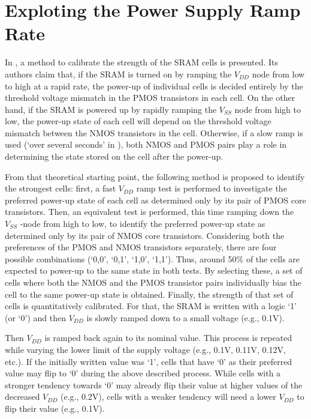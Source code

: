 \section{Exploting the Power Supply Ramp Rate}
\label{sec:bitselection:supply_ramp}
In \cite{Wang2018}, a method to calibrate the strength of the SRAM cells is presented. Its authors claim that, if the SRAM is turned on by ramping the $V_{DD}$ node from low to high at a rapid rate, the power-up of individual cells is decided entirely by the threshold voltage mismatch in the PMOS transistors in each cell. On the other hand, if the SRAM is powered up by rapidly ramping the $V_{SS}$ node from high to low, the power-up state of each cell will depend on the threshold voltage mismatch between the NMOS transistors in the cell. Otherwise, if a slow ramp is used (‘over several seconds’ in \cite{Wang2018}), both NMOS and PMOS pairs play a role in determining the state stored on the cell after the power-up.


From that theoretical starting point, the following method is proposed to identify the strongest cells: first, a fast $V_{DD}$ ramp test is performed to investigate the preferred power-up state of each cell as determined only by its pair of PMOS core transistors. Then, an equivalent test is performed, this time ramping down the $V_{SS}$ -node from high to low, to identify the preferred power-up state as determined only by its pair of NMOS core transistors. Considering both the preferences of the PMOS and NMOS transistors separately, there are four possible combinations (‘0,0’, ‘0,1’, ‘1,0’, ‘1,1’). Thus, around 50\% of the cells are expected to power-up to the same state in both tests. By selecting these, a set of cells where both the NMOS and the PMOS transistor pairs individually bias the cell to the same power-up state is obtained. Finally, the strength of that set of cells is quantitatively calibrated. For that, the SRAM is written with a logic ‘1’ (or ‘0’) and then $V_{DD}$ is slowly ramped down to a small voltage (e.g., 0.1V).

Then $V_{DD}$ is ramped back again to its nominal value. This process is repeated while varying the lower limit of the supply voltage (e.g., 0.1V, 0.11V, 0.12V, etc.). If the initially written value was ‘1’, cells that have ‘0’ as their preferred value may flip to ‘0’ during the above described process. While cells with a stronger tendency towards ‘0’ may already flip their value at higher values of the decreased $V_{DD}$ (e.g., 0.2V), cells with a weaker tendency will need a lower $V_{DD}$ to flip their value (e.g., 0.1V).

